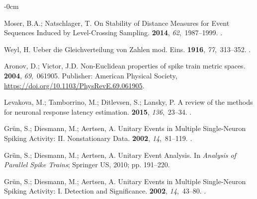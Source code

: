 \documentclass[brainsci, %
               review,submit,pdftex,moreauthors
               ]{Definitions/mdpi}
\begin{document}
\begin{adjustwidth}{-\extralength}{0cm}
\begin{thebibliography}{999}
  Moser, B.A.; Natschlager, T.
  \newblock On {Stability} of {Distance} {Measures} for {Event} {Sequences}
    {Induced} by {Level}-{Crossing} {Sampling}.
   {\bf 2014}, {\em
    62},~1987--1999.
  .
  
  Weyl, H.
  \newblock Ueber die {Gleichverteilung} von {Zahlen} mod. {Eins}.
   {\bf 1916}, {\em 77},~313--352.
  .
  
  Aronov, D.; Victor, J.D.
  \newblock Non-{Euclidean} properties of spike train metric spaces.
   {\bf 2004}, {\em 69},~061905.
  \newblock Publisher: American Physical Society,
    {\url{https://doi.org/10.1103/PhysRevE.69.061905}}.
  
  Levakova, M.; Tamborrino, M.; Ditlevsen, S.; Lansky, P.
  \newblock A review of the methods for neuronal response latency estimation.
   {\bf 2015}, {\em 136},~23--34.
  .
  
  Grün, S.; Diesmann, M.; Aertsen, A.
  \newblock Unitary {Events} in {Multiple} {Single}-{Neuron} {Spiking}
    {Activity}: {II}. {Nonstationary} {Data}.
   {\bf 2002}, {\em 14},~81--119.
  .
  
  Grün, S.; Diesmann, M.; Aertsen, A.
  \newblock Unitary {Event} {Analysis}. In {\em Analysis of {Parallel} {Spike}
    {Trains}}; Springer US,  2010; pp. 191--220.
  
  Grün, S.; Diesmann, M.; Aertsen, A.
  \newblock Unitary {Events} in {Multiple} {Single}-{Neuron} {Spiking}
    {Activity}: {I}. {Detection} and {Significance}.
   {\bf 2002}, {\em 14},~43--80.
  .
  

\end{thebibliography}
\end{adjustwidth}
\end{document}
